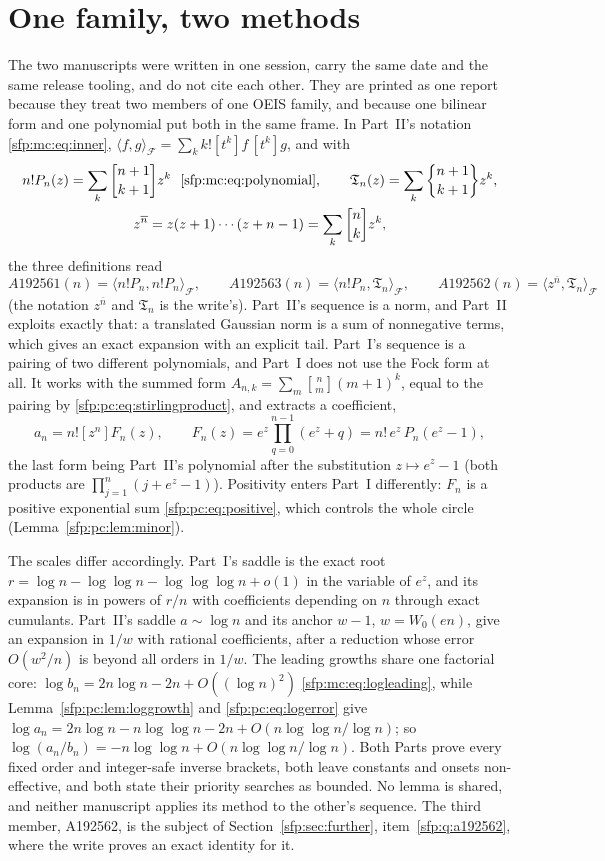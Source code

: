 \documentclass[11pt,letterpaper]{article}
\numberwithin{equation}{section}
\theoremstyle{definition}\newtheorem{definition}[theorem]{Definition}
\theoremstyle{remark}\newtheorem{remark}[theorem]{Remark}
\newcommand{\sone}[2]{\genfrac{[}{]}{0pt}{}{#1}{#2}}
\newcommand{\stwo}[2]{\genfrac{\{} {\}}{0pt}{}{#1}{#2}}
\begin{document}
\section*{One family, two methods}\label{sfp:sec:family}
The two manuscripts were written in one session, carry the same date and the same release tooling, and do not cite each other. They are printed as one report because they treat two members of one OEIS family, and because one bilinear form and one polynomial put both in the same frame. In Part~II's notation \eqref{sfp:mc:eq:inner}, $\langle f,g\rangle_{\mathcal F}=\sum_kk![t^k]f\,[t^k]g$, and with
\begin{gather*}
 n!P_n(z)=\sum_k\sone{n+1}{k+1}z^k\ \ \eqref{sfp:mc:eq:polynomial},\qquad
 \mathfrak T_n(z)=\sum_k\stwo{n+1}{k+1}z^k,\\
 z^{\overline n}=z(z+1)\cdots(z+n-1)=\sum_k\sone nkz^k,
\end{gather*}
the three definitions read
\[
 A192561(n)=\langle n!P_n,n!P_n\rangle_{\mathcal F},\qquad
 A192563(n)=\langle n!P_n,\mathfrak T_n\rangle_{\mathcal F},\qquad
 A192562(n)=\langle z^{\overline n},\mathfrak T_n\rangle_{\mathcal F}
\]
(the notation $z^{\overline n}$ and $\mathfrak T_n$ is the write's). Part~II's sequence is a norm, and Part~II exploits exactly that: a translated Gaussian norm is a sum of nonnegative terms, which gives an exact expansion with an explicit tail. Part~I's sequence is a pairing of two different polynomials, and Part~I does not use the Fock form at all. It works with the summed form $A_{n,k}=\sum_m\sone nm(m+1)^k$, equal to the pairing by \eqref{sfp:pc:eq:stirlingproduct}, and extracts a coefficient,
\[
 a_n=n![z^n]F_n(z),\qquad F_n(z)=e^z\prod_{q=0}^{n-1}(e^z+q)=n!\,e^z\,P_n(e^z-1),
\]
the last form being Part~II's polynomial after the substitution $z\mapsto e^z-1$ (both products are $\prod_{j=1}^n(j+e^z-1)$). Positivity enters Part~I differently: $F_n$ is a positive exponential sum \eqref{sfp:pc:eq:positive}, which controls the whole circle (Lemma~\ref{sfp:pc:lem:minor}).

The scales differ accordingly. Part~I's saddle is the exact root $r=\log n-\log\log n-\log\log\log n+o(1)$ in the variable of $e^z$, and its expansion is in powers of $r/n$ with coefficients depending on $n$ through exact cumulants. Part~II's saddle $a\sim\log n$ and its anchor $w-1$, $w=W_0(en)$, give an expansion in $1/w$ with rational coefficients, after a reduction whose error $O(w^2/n)$ is beyond all orders in $1/w$. The leading growths share one factorial core: $\log b_n=2n\log n-2n+O((\log n)^2)$ \eqref{sfp:mc:eq:logleading}, while Lemma~\ref{sfp:pc:lem:loggrowth} and \eqref{sfp:pc:eq:logerror} give $\log a_n=2n\log n-n\log\log n-2n+O(n\log\log n/\log n)$; so $\log(a_n/b_n)=-n\log\log n+O(n\log\log n/\log n)$. Both Parts prove every fixed order and integer-safe inverse brackets, both leave constants and onsets non-effective, and both state their priority searches as bounded. No lemma is shared, and neither manuscript applies its method to the other's sequence. The third member, A192562, is the subject of Section~\ref{sfp:sec:further}, item~\ref{sfp:q:a192562}, where the write proves an exact identity for it.
\end{document}
